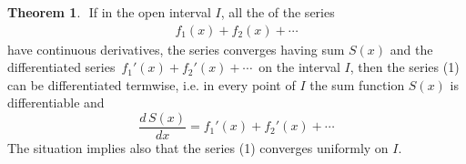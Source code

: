 \documentclass[12pt]{article}
\theoremstyle{definition}
\newtheorem*{thmplain}{Theorem}
\begin{document}
\begin{thmplain}
\,\,If in the open interval $I$,
all the  of the series 
  \begin{align}     
          f_1(x)\!+\!f_2(x)\!+\cdots
  \end{align}
have continuous derivatives,
the series converges  having sum $S(x)$ and
the differentiated series\, $f_1'(x)\!+\!f_2'(x)\!+\!\cdots$\, 
 on the interval $I$,
then the series (1) can be differentiated termwise, i.e. in every point of $I$ the sum function $S(x)$ is differentiable and
       $$\frac{d\,S(x)}{dx} = f_1'(x)\!+\!f_2'(x)\!+\cdots$$
The situation implies also that the series (1) converges uniformly on $I$.
\end{thmplain}
\end{document}
